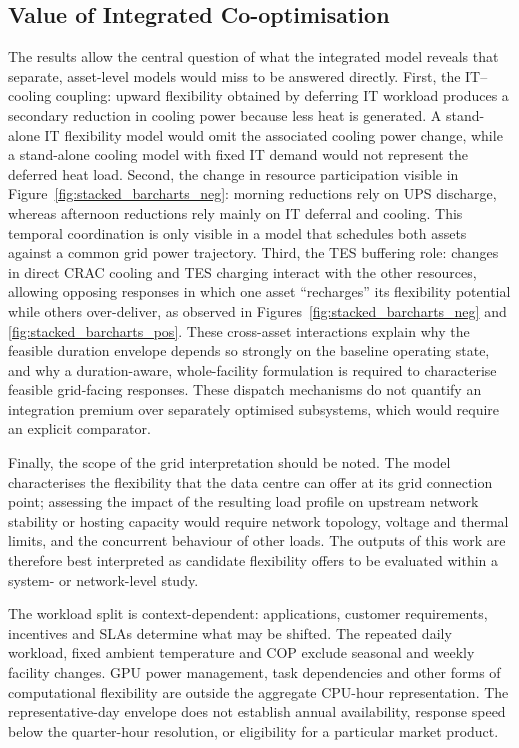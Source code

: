 \documentclass[lettersize,journal]{IEEEtran}
\newcommand{\rev}[1]{#1}
\begin{document}
\subsection{\rev{Value of Integrated Co-optimisation}}\label{sec:integration-value}
\rev{The results allow the central question of what the integrated model reveals that separate, asset-level models would miss to be answered directly. First, the IT--cooling coupling: upward flexibility obtained by deferring IT workload produces a secondary reduction in cooling power because less heat is generated. A stand-alone IT flexibility model would omit the associated cooling power change, while a stand-alone cooling model with fixed IT demand would not represent the deferred heat load. Second, the change in resource participation visible in Figure~\ref{fig:stacked_barcharts_neg}: morning reductions rely on UPS discharge, whereas afternoon reductions rely mainly on IT deferral and cooling. This temporal coordination is only visible in a model that schedules both assets against a common grid power trajectory. Third, the TES buffering role: changes in direct CRAC cooling and TES charging interact with the other resources, allowing opposing responses in which one asset ``recharges'' its flexibility potential while others over-deliver, as observed in Figures~\ref{fig:stacked_barcharts_neg} and \ref{fig:stacked_barcharts_pos}. These cross-asset interactions explain why the feasible duration envelope depends so strongly on the baseline operating state, and why a duration-aware, whole-facility formulation is required to characterise feasible grid-facing responses. These dispatch mechanisms do not quantify an integration premium over separately optimised subsystems, which would require an explicit comparator.}

\rev{Finally, the scope of the grid interpretation should be noted. The model characterises the flexibility that the data centre can offer at its grid connection point; assessing the impact of the resulting load profile on upstream network stability or hosting capacity would require network topology, voltage and thermal limits, and the concurrent behaviour of other loads. The outputs of this work are therefore best interpreted as candidate flexibility offers to be evaluated within a system- or network-level study.}

The workload split is context-dependent: applications, customer requirements, incentives and SLAs determine what may be shifted. The repeated daily workload, fixed ambient temperature and COP exclude seasonal and weekly facility changes. GPU power management, task dependencies and other forms of computational flexibility are outside the aggregate CPU-hour representation. The representative-day envelope does not establish annual availability, response speed below the quarter-hour resolution, or eligibility for a particular market product.
\end{document}

